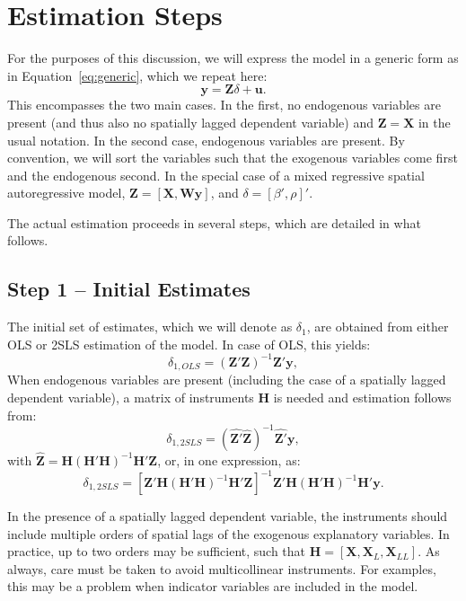 \documentclass{article}
\begin{document}
\section{Estimation Steps}
For the purposes of this discussion, we will express the model in a generic form as
in Equation~\ref{eq:generic}, which we repeat here:
\begin{equation*}
\mathbf{y} = \mathbf{Z} \delta + \mathbf{u}.
\end{equation*}
This encompasses the two main cases. In the first, no endogenous variables
are present (and thus also no spatially lagged dependent variable) and 
$\mathbf{Z} = \mathbf{X}$ in the usual notation. In the second case, endogenous
variables are present. By convention, we will sort the variables such that the
exogenous variables come first and the endogenous second. In the special
case of a mixed regressive spatial autoregressive model, $\mathbf{Z} = [ \mathbf{X}, \mathbf{Wy} ]$,
and $\delta = [ \beta', \rho]'$.

The actual estimation proceeds in several steps, which are detailed in what follows.

\subsection{Step 1 -- Initial Estimates}
The initial set of estimates, which we will denote as $\delta_1$, are obtained from
either OLS or 2SLS estimation of the model. In case of OLS, this yields:
\begin{equation*}
\delta_{1,OLS} = (\mathbf{Z'Z})^{-1} \mathbf{Z'y},
\end{equation*}
When endogenous variables are present (including the case of a spatially lagged
dependent variable), a matrix of instruments $\mathbf{H}$ is needed and 
estimation follows from:
\begin{equation*}
\delta_{1,2SLS} = (\hat{\mathbf{Z'}} \hat{\mathbf{Z}} )^{-1} \hat{\mathbf{Z'}} \mathbf{y},
\end{equation*}
with $\hat{\mathbf{Z}} = \mathbf{H} (\mathbf{H'H} )^{-1} \mathbf{H'Z}$, or, in one expression, as:
\begin{equation*}
\delta_{1,2SLS} = [ \mathbf{Z'H} (\mathbf{H'H})^{-1} \mathbf{H'Z} ]^{-1} \mathbf{Z'H} (\mathbf{H'H})^{-1} \mathbf{H'} \mathbf{y}.
\end{equation*}

In the presence of a spatially lagged dependent variable, the instruments should 
include multiple orders of spatial lags of the exogenous explanatory variables.
In practice, up to two orders may be sufficient, such that $\mathbf{H} = [ \mathbf{X},
\mathbf{X}_L, \mathbf{X}_{LL} ]$. As always, care must be taken to avoid multicollinear
instruments. For examples, this may be a problem when indicator variables are
included in the model.
\end{document}
